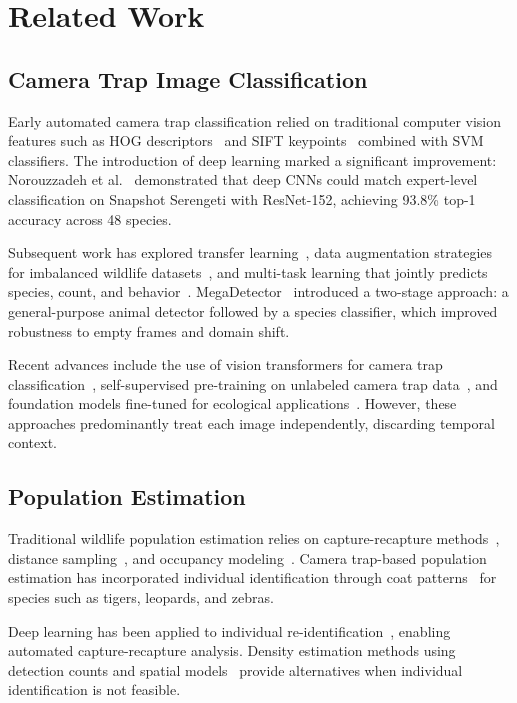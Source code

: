 \documentclass[11pt,letterpaper]{article}
\begin{document}
\section{Related Work}

\subsection{Camera Trap Image Classification}

Early automated camera trap classification relied on traditional computer vision features such as HOG descriptors~\cite{dalal2005} and SIFT keypoints~\cite{lowe2004} combined with SVM classifiers. The introduction of deep learning marked a significant improvement: Norouzzadeh et al.~\cite{norouzzadeh2018} demonstrated that deep CNNs could match expert-level classification on Snapshot Serengeti with ResNet-152, achieving 93.8\% top-1 accuracy across 48 species.

Subsequent work has explored transfer learning~\cite{tabak2019}, data augmentation strategies for imbalanced wildlife datasets~\cite{beery2019}, and multi-task learning that jointly predicts species, count, and behavior~\cite{willi2019}. MegaDetector~\cite{beery2019mega} introduced a two-stage approach: a general-purpose animal detector followed by a species classifier, which improved robustness to empty frames and domain shift.

Recent advances include the use of vision transformers for camera trap classification~\cite{dosovitskiy2021}, self-supervised pre-training on unlabeled camera trap data~\cite{pantazis2021}, and foundation models fine-tuned for ecological applications~\cite{weinstein2022}. However, these approaches predominantly treat each image independently, discarding temporal context.

\subsection{Population Estimation}

Traditional wildlife population estimation relies on capture-recapture methods~\cite{jolly1965, seber1965}, distance sampling~\cite{buckland2001}, and occupancy modeling~\cite{mackenzie2002}. Camera trap-based population estimation has incorporated individual identification through coat patterns~\cite{karanth1998} for species such as tigers, leopards, and zebras.

Deep learning has been applied to individual re-identification~\cite{schneider2020}, enabling automated capture-recapture analysis. Density estimation methods using detection counts and spatial models~\cite{chandler2011} provide alternatives when individual identification is not feasible.
\end{document}
